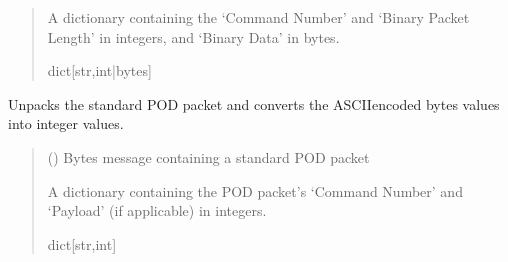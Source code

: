 \documentclass[letterpaper,10pt,english]{sphinxmanual}
\begin{document}
\begin{fulllineitems}
\begin{fulllineitems}
\begin{quote}
\begin{description}
\sphinxAtStartPar
A dictionary containing the ‘Command Number’ and ‘Binary Packet Length’                 in integers, and ‘Binary Data’ in bytes.

\sphinxAtStartPar
dict{[}str,int|bytes{]}

\end{description}\end{quote}

\end{fulllineitems}


\begin{fulllineitems}
\label{\detokenize{BasicPodProtocol:BasicPodProtocol.POD_Basics.TranslatePODpacket_Standard}}
\pysigstartsignatures
{}
\pysigstopsignatures
\sphinxAtStartPar
Unpacks the standard POD packet and converts the ASCII\sphinxhyphen{}encoded bytes values into integer values.
\begin{quote}\begin{description}
\sphinxAtStartPar
{} () \textendash{} Bytes message containing a standard POD packet

\sphinxAtStartPar
A dictionary containing the POD packet’s ‘Command Number’ and ‘Payload’                 (if applicable) in integers.

\sphinxAtStartPar
dict{[}str,int{]}

\end{description}\end{quote}

\end{fulllineitems}



\end{fulllineitems}
\end{document}
